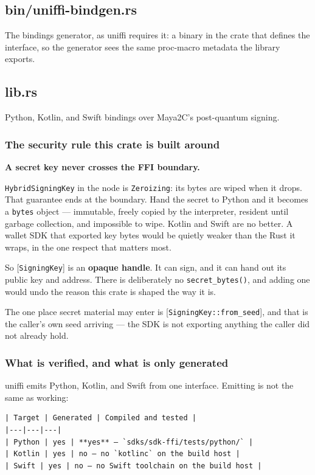 \documentclass[11pt,a4paper]{article}
\begin{document}
\subsection{bin/uniffi-bindgen.rs}
The bindings generator, as uniffi requires it: a binary in the crate that
defines the interface, so the generator sees the same proc-macro metadata
the library exports.

\subsection{lib.rs}
Python, Kotlin, and Swift bindings over Maya2C's post-quantum signing.

\subsubsection{The security rule this crate is built around}

\textbf{A secret key never crosses the FFI boundary.}

\texttt{HybridSigningKey} in the node is \texttt{Zeroizing}: its bytes are wiped when it
drops. That guarantee ends at the boundary. Hand the secret to Python and it
becomes a \texttt{bytes} object — immutable, freely copied by the interpreter,
resident until garbage collection, and impossible to wipe. Kotlin and Swift
are no better. A wallet SDK that exported key bytes would be quietly
weaker than the Rust it wraps, in the one respect that matters most.

So [\texttt{SigningKey}] is an \textbf{opaque handle}. It can sign, and it can hand out
its public key and address. There is deliberately no \texttt{secret\_bytes()}, and
adding one would undo the reason this crate is shaped the way it is.

The one place secret material may enter is [\texttt{SigningKey::from\_seed}], and
that is the caller's own seed arriving — the SDK is not exporting anything
the caller did not already hold.

\subsubsection{What is verified, and what is only generated}

uniffi emits Python, Kotlin, and Swift from one interface. Emitting is not
the same as working:

\begin{verbatim}
| Target | Generated | Compiled and tested |
|---|---|---|
| Python | yes | **yes** — `sdks/sdk-ffi/tests/python/` |
| Kotlin | yes | no — no `kotlinc` on the build host |
| Swift | yes | no — no Swift toolchain on the build host |
\end{verbatim}
\end{document}
